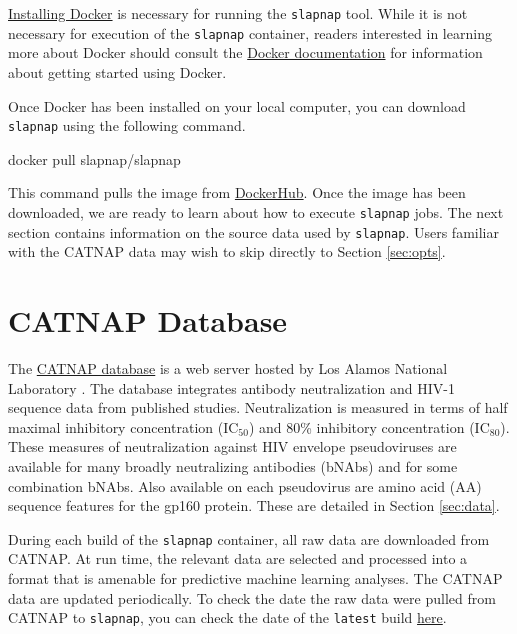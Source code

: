 \documentclass[]{article}
\newenvironment{Shaded}{\begin{snugshade}}{\end{snugshade}}
\newcommand{\ExtensionTok}[1]{#1}
\newcommand{\NormalTok}[1]{#1}
\begin{document}
\href{https://docs.docker.com/docker-for-windows/install/}{Installing
Docker} is necessary for running the \texttt{slapnap} tool. While it is
not necessary for execution of the \texttt{slapnap} container, readers
interested in learning more about Docker should consult the
\href{https://docs.docker.com/get-started/}{Docker documentation} for
information about getting started using Docker.

Once Docker has been installed on your local computer, you can download
\texttt{slapnap} using the following command.

\begin{Shaded}
\begin{Highlighting}[]
\ExtensionTok{docker}\NormalTok{ pull slapnap/slapnap}
\end{Highlighting}
\end{Shaded}

This command pulls the image from
\href{https://hub.docker.com/}{DockerHub}. Once the image has been
downloaded, we are ready to learn about how to execute \texttt{slapnap}
jobs. The next section contains information on the source data used by
\texttt{slapnap}. Users familiar with the CATNAP data may wish to skip
directly to Section \ref{sec:opts}.

\section{CATNAP Database}\label{sec:catnap}

The
\href{https://www.hiv.lanl.gov/components/sequence/HIV/neutralization/index.html}{CATNAP
database} is a web server hosted by Los Alamos National Laboratory
\citep{yoon2015catnap}. The database integrates antibody neutralization
and HIV-1 sequence data from published studies. Neutralization is
measured in terms of half maximal inhibitory concentration (IC\(_{50}\))
and 80\% inhibitory concentration (IC\(_{80}\)). These measures of
neutralization against HIV envelope pseudoviruses are available for many
broadly neutralizing antibodies (bNAbs) and for some combination bNAbs.
Also available on each pseudovirus are amino acid (AA) sequence features
for the gp160 protein. These are detailed in Section \ref{sec:data}.

During each build of the \texttt{slapnap} container, all raw data are
downloaded from CATNAP. At run time, the relevant data are selected and
processed into a format that is amenable for predictive machine learning
analyses. The CATNAP data are updated periodically. To check the date
the raw data were pulled from CATNAP to \texttt{slapnap}, you can check
the date of the \texttt{latest} build
\href{https://hub.docker.com/repository/registry-1.docker.io/slapnap/slapnap/tags?page=1}{here}.
\end{document}
